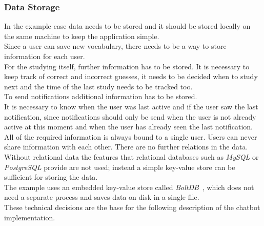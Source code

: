 \subsubsection{Data Storage}

In the example case data needs to be stored and it should be stored locally on the same machine
to keep the application simple.
\\

Since a user can save new vocabulary,
there needs to be a way to store information for each user.
\\
For the studying itself, further information has to be stored.
It is necessary to keep track of correct and incorrect guesses, it needs to be decided when to study next and the time of the last study needs to be tracked too.
\\

To send notifications additional information has to be stored.
\\
It is necessary to know when the user was last active and if the user saw the last notification,
since notifications should only be send when the user is not already active at this moment
and when the user has already seen the last notification.
\\

All of the required information is always bound to a single user.
Users can never share information with each other.
There are no further relations in the data.
\\
Without relational data the features that relational databases such as \emph{MySQL} or \emph{PostgreSQL} provide are not used;
instead a simple key-value store can be sufficient for storing the data.
\\
The example uses an embedded key-value store called \emph{BoltDB}~\cite{boltdb}, which does not need a separate process and saves data on disk in a single file.
\\


These technical decisions are the base for the following description of the chatbot implementation.
